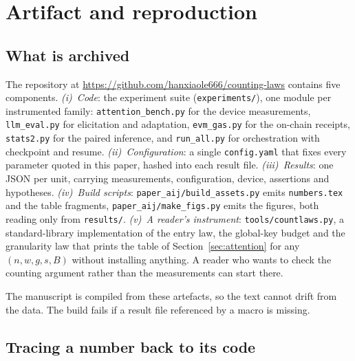 \section{Artifact and reproduction}\label{app:artifact}

\subsection*{What is archived}

The repository at \url{https://github.com/hanxiaole666/counting-laws} contains five
components. \emph{(i)~Code}: the experiment suite (\texttt{experiments/}), one
module per instrumented family: \texttt{attention\_bench.py} for the device
measurements, \texttt{llm\_eval.py} for elicitation and adaptation,
\texttt{evm\_gas.py} for the on-chain receipts, \texttt{stats2.py} for the paired
inference, and \texttt{run\_all.py} for orchestration with checkpoint and resume.
\emph{(ii)~Configuration}: a single \texttt{config.yaml} that fixes every parameter
quoted in this paper, hashed into each result file. \emph{(iii)~Results}: one JSON
per unit, carrying measurements, configuration, device, assertions and hypotheses.
\emph{(iv)~Build scripts}: \texttt{paper\_aij/build\_assets.py} emits
\texttt{numbers.tex} and the table fragments, \texttt{paper\_aij/make\_figs.py}
emits the figures, both reading only from \texttt{results/}.
\emph{(v)~A reader's instrument}: \texttt{tools/countlaws.py}, a standard-library
implementation of the entry law, the global-key budget and the granularity law
that prints the table of Section~\ref{sec:attention} for any $(n,w,g,s,B)$ without
installing anything. A reader who wants to check the counting argument rather than
the measurements can start there.

The manuscript is compiled from these artefacts, so the text cannot drift from the
data. The build fails if a result file referenced by a macro is missing.

\subsection*{Tracing a number back to its code}

